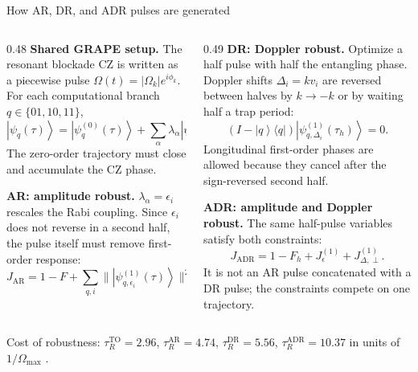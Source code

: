 \documentclass[aspectratio=169,11pt]{beamer}
\newcommand{\ket}[1]{\left|#1\right\rangle}
\begin{document}
\begin{frame}{How AR, DR, and ADR pulses are generated}
  \scriptsize
  \setlength{\abovedisplayskip}{2pt}
  \setlength{\belowdisplayskip}{2pt}
  \begin{columns}[T,onlytextwidth]
    \begin{column}{0.48\textwidth}
      \textbf{Shared GRAPE setup.}
      The resonant blockade CZ is written as a piecewise pulse
      \(\Omega(t)=|\Omega_k|e^{i\phi_k}\). For each computational branch
      \(q\in\{01,10,11\}\),
      \[
        \ket{\psi_q(\tau)}
        =
        \ket{\psi_q^{(0)}(\tau)}
        +\sum_\alpha \lambda_\alpha
        \ket{\psi_{q,\alpha}^{(1)}(\tau)}
        +O(\lambda^2).
      \]
      The zero-order trajectory must close and accumulate the CZ phase.

      \vspace{1mm}
      \textbf{AR: amplitude robust.}
      \(\lambda_\alpha=\epsilon_i\) rescales the Rabi coupling. Since
      \(\epsilon_i\) does not reverse in a second half, the pulse itself must
      remove first-order response:
      \[
        J_{\mathrm{AR}}
        =
        1-F+
        \sum_{q,i}
        \|\ket{\psi_{q,\epsilon_i}^{(1)}(\tau)}\|^2 .
      \]
    \end{column}

    \begin{column}{0.49\textwidth}
      \textbf{DR: Doppler robust.}
      Optimize a half pulse with half the entangling phase. Doppler shifts
      \(\Delta_i=k v_i\) are reversed between halves by
      \(k\rightarrow-k\) or by waiting half a trap period:
      \[
        (I-\ket q\!\langle q|)
        \ket{\psi_{q,\Delta_i}^{(1)}(\tau_h)}=0 .
      \]
      Longitudinal first-order phases are allowed because they cancel after
      the sign-reversed second half.

      \vspace{1mm}
      \textbf{ADR: amplitude and Doppler robust.}
      The same half-pulse variables satisfy both constraints:
      \[
        J_{\mathrm{ADR}}
        =
        1-F_h+
        J_{\epsilon}^{(1)}
        +J_{\Delta,\perp}^{(1)} .
      \]
      It is not an AR pulse concatenated with a DR pulse; the constraints
      compete on one trajectory.
    \end{column}
  \end{columns}

  \vspace{1mm}
  \begin{center}
    \scriptsize
    Cost of robustness:
    \(\tau_R^{\mathrm{TO}}=2.96\),
    \(\tau_R^{\mathrm{AR}}=4.74\),
    \(\tau_R^{\mathrm{DR}}=5.56\),
    \(\tau_R^{\mathrm{ADR}}=10.37\)
    in units of \(1/\Omega_{\max}\)
    \cite{janduraOptimizingRydbergGates2023}.
  \end{center}
\end{frame}
\end{document}
